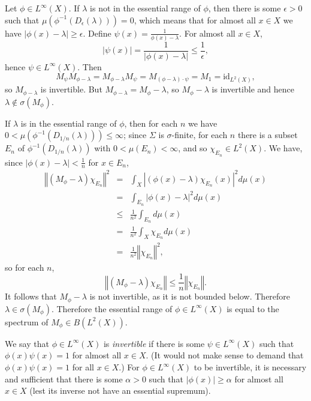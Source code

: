 \documentclass{article}
\newcommand{\id}{\textrm{id}}
\newcommand{\norm}[1]{\left\Vert #1 \right\Vert}
\begin{document}
Let $\phi \in L^\infty(X)$.
If $\lambda$ is not in the essential range of $\phi$, then there is some $\epsilon>0$ such that $\mu(\phi^{-1}(D_\epsilon(\lambda)))=0$,
which means that for almost all $x \in X$ we have $|\phi(x)-\lambda| \geq \epsilon$.
Define $\psi(x)=\frac{1}{\phi(x)-\lambda}$. For almost all $x \in X$,
\[
|\psi(x)|=\frac{1}{|\phi(x)-\lambda|} \leq \frac{1}{\epsilon},
\]
hence $\psi \in L^\infty(X)$. Then
\[
M_{\psi} M_{\phi-\lambda} = M_{\phi-\lambda} M_{\psi}=M_{(\phi-\lambda)\cdot \psi}=M_{1}=\id_{L^2(X)},
\]
so $M_{\phi-\lambda}$ is invertible. But $M_{\phi-\lambda}=M_\phi - \lambda$, so $M_\phi-\lambda$ is invertible and hence $\lambda \not \in
\sigma(M_\phi)$.

If $\lambda$ is in the essential range of $\phi$, then for each $n$ we have $0 < \mu(\phi^{-1}(D_{1/n}(\lambda))) \leq \infty$; 
since $\Sigma$ is $\sigma$-finite, for each $n$ there is a subset $E_n$ of 
$\phi^{-1}(D_{1/n}(\lambda))$ with $0 < \mu(E_n) < \infty$, and so $\chi_{E_n} \in L^2(X)$.
We have, since $|\phi(x)-\lambda|<\frac{1}{n}$ for $x \in E_n$,
\begin{eqnarray*}
\norm{(M_\phi-\lambda) \chi_{E_n}}^2&=&\int_X |(\phi(x)-\lambda)\chi_{E_n}(x)|^2 d\mu(x)\\
&=&\int_{E_n} |\phi(x)-\lambda|^2 d\mu(x)\\
&\leq&\frac{1}{n^2} \int_{E_n} d\mu(x)\\
&=&\frac{1}{n^2} \int_X \chi_{E_n} d\mu(x)\\
&=&\frac{1}{n^2} \norm{\chi_{E_n}}^2,
\end{eqnarray*}
so for each $n$,
\[
\norm{(M_\phi-\lambda) \chi_{E_n}} \leq \frac{1}{n} \norm{\chi_{E_n}}.
\]
It follows that $M_\phi-\lambda$ is not invertible, as it is not bounded below. Therefore $\lambda \in \sigma(M_\phi)$.
Therefore the essential range of $\phi \in L^\infty(X)$ is equal to the spectrum of $M_\phi \in B(L^2(X))$.

We say that $\phi \in L^\infty(X)$ is {\em invertible} if there is some $\psi \in L^\infty(X)$ such that $\phi(x)\psi(x)=1$ for almost all $x \in X$. (It would not make sense to demand
that $\phi(x)\psi(x)=1$ for all $x \in X$.) For $\phi \in L^\infty(X)$ to be invertible, it is necessary and sufficient that there is some $\alpha>0$ such that
$|\phi(x)| \geq \alpha$ for almost all $x \in X$ (lest its inverse not have an essential supremum). 
\end{document}
